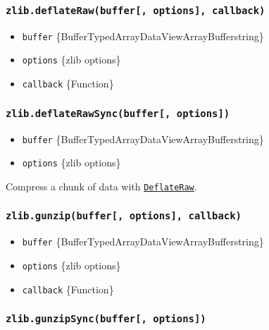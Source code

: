 \subsubsection{\texorpdfstring{\texttt{zlib.deflateRaw(buffer{[},\ options{]},\ callback)}}{zlib.deflateRaw(buffer{[}, options{]}, callback)}}\label{zlib.deflaterawbuffer-options-callback}

\begin{itemize}
\tightlist
\item
  \texttt{buffer}
  \{Buffer\textbar TypedArray\textbar DataView\textbar ArrayBuffer\textbar string\}
\item
  \texttt{options} \{zlib options\}
\item
  \texttt{callback} \{Function\}
\end{itemize}

\subsubsection{\texorpdfstring{\texttt{zlib.deflateRawSync(buffer{[},\ options{]})}}{zlib.deflateRawSync(buffer{[}, options{]})}}\label{zlib.deflaterawsyncbuffer-options}

\begin{itemize}
\tightlist
\item
  \texttt{buffer}
  \{Buffer\textbar TypedArray\textbar DataView\textbar ArrayBuffer\textbar string\}
\item
  \texttt{options} \{zlib options\}
\end{itemize}

Compress a chunk of data with
\hyperref[class-zlibdeflateraw]{\texttt{DeflateRaw}}.

\subsubsection{\texorpdfstring{\texttt{zlib.gunzip(buffer{[},\ options{]},\ callback)}}{zlib.gunzip(buffer{[}, options{]}, callback)}}\label{zlib.gunzipbuffer-options-callback}

\begin{itemize}
\tightlist
\item
  \texttt{buffer}
  \{Buffer\textbar TypedArray\textbar DataView\textbar ArrayBuffer\textbar string\}
\item
  \texttt{options} \{zlib options\}
\item
  \texttt{callback} \{Function\}
\end{itemize}

\subsubsection{\texorpdfstring{\texttt{zlib.gunzipSync(buffer{[},\ options{]})}}{zlib.gunzipSync(buffer{[}, options{]})}}\label{zlib.gunzipsyncbuffer-options}

